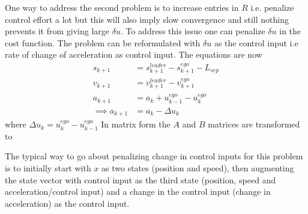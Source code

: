

One way to address the second problem is to increase entries in $R$ i.e. penalize control effort a lot but this will also imply slow convergence and still nothing prevents it from giving large $\delta u$. To address this issue one can penalize $\delta u$ in the cost function. The problem can be reformulated with $\delta u$ as the control input i.e rate of change of acceleration as control input. The equations are now
\begin{align}
    s_{k+1} &= s_{k+1}^{leader} - s_{k+1}^{ego} - L_{sep} \\
    v_{k+1} &= v_{k+1}^{leader} - v_{k+1}^{ego} \\
    a_{k+1} &=  a_{k} + u_{k-1}^{ego}- u_{k}^{ego} \\
    \implies a_{k+1} &= a_{k} - \Delta u_{k}
\end{align}
where $\Delta u_{k} = u_{k}^{ego}- u_{k-1}^{ego}$
In matrix form the $A$ and $B$ matrices are transformed to

The typical way to go about penalizing change in control inputs for this problem is to initially start with $x$ as two states (position and speed), then augmenting the state vector with control input as the third state (position, speed and acceleration/control input) and a change in the control input (change in acceleration) as the control input.
\iffalse
\begin{align}
    x'_{k+1} &= A'x'_{k} + B'u'_{k}
\end{align}
with $x'_{k}=\begin{bmatrix}s_{k} \\ v_{k} \\ a_{k} \\u_{k}\end{bmatrix}$
, $A'=\begin{bmatrix}1 & \delta t & 0.5\delta t^2  & 0\\ 0 & 1 & \delta t & 0\\ 0 & 0 & 0 & -1 \\ 0 & 0 & 0 & 1 \end{bmatrix}$ and $B'=\begin{bmatrix} 0 \\0 \\ -1 \\ 1 \end{bmatrix}$ and $u'_{k}=u_{k} - u_{k-1}=\Delta u_{k}$
\fi
